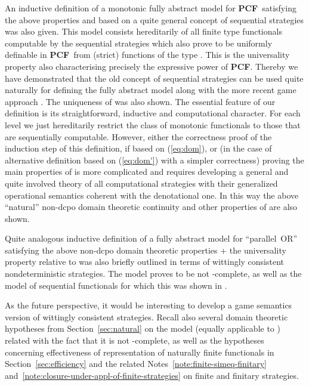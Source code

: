 \documentclass[fleqn]{LMCS}
\theoremstyle{plain}\newtheorem{satz}[thm]{Satz}
\theoremstyle{plain}\newtheorem{hyp}[thm]{Hypothesis}
\theoremstyle{plain}\newtheorem{hyps}[thm]{Hypotheses}
\theoremstyle{definition}\newtheorem{note}[thm]{Note}
\newcommand{\PCF}{\mbox{\bf PCF}}
\newcommand{\?}{\mbox{?}}
\begin{document}
An inductive definition of a monotonic fully abstract 
model  for \PCF\ satisfying the above properties and 
based on a quite general concept of 
sequential strategies was also given. 
This model consists hereditarily of all finite type functionals 
computable by the sequential 
strategies which also prove to be uniformly definable in \PCF\ from 
(strict)
functions of the type . 
This is the universality property also characterising 
precisely the expressive power of \PCF. 
Thereby we have demonstrated 
that the old concept of sequential strategies \cite{Saz76SMZH,Saz76AL} 
can be used quite naturally for defining the fully abstract 
model along with 
the more recent game approach 
\cite{Abramsky-Jagadeesan2000,Hyland-Ong2000,Nickau96}. 
The uniqueness of  was also shown. 
The essential feature of our definition is its straightforward, 
inductive and computational character. 
For each level we just hereditarily restrict the class of monotonic 
functionals to those that are sequentially computable. 
However, either the correctness proof of the induction step of 
this definition, if based on (\ref{eq:dom}), 
or (in the case of alternative definition based on (\ref{eq:dom'}) with a simpler 
correctness) proving the main properties 
of  is more complicated 
and requires developing a general and quite involved theory of all 
computational strategies 
with their generalized operational semantics 
coherent with the denotational one. 
In this way the above ``natural'' 
non-dcpo domain theoretic continuity and other properties of 
 are also shown. 

Quite analogous inductive definition of a fully abstract model 
 for ``\mbox{parallel OR}'' satisfying 
the above non-dcpo domain theoretic properties 
+ the universality property relative to  
was also briefly outlined in terms 
of wittingly consistent nondeterministic strategies.  
The model  proves to be not -complete, as well as  
the model of sequential functionals  
for which this was shown in \cite{Normann2004}.  

As the future perspective, it would be interesting 
to develop a game semantics version of wittingly consistent strategies. 
Recall also several domain theoretic hypotheses from Section~\ref{sec:natural} 
on the model  (equally applicable to ) 
related with the fact that it is not -complete, as well as the 
hypotheses concerning effectiveness of representation of naturally finite functionals 
in Section~\ref{sec:efficiency} and the related Notes~\ref{note:finite-simeq-finitary} 
and~\ref{note:closure-under-appl-of-finite-strategies} on finite and finitary strategies. 
\end{document}
